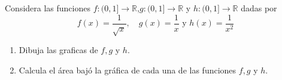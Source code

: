 \documentclass[12pt,a4paper]{article}
\begin{document}
    \begin{mdframed}[style=mdbluebox,frametitle={Ejercicio 4}]
        Considera las funciones $f:(0,1]\to\mathbb{R}$,$g:(0,1]\to\mathbb{R}$ y $h:(0,1]\to\mathbb{R}$ dadas por
        \begin{equation*}
            f(x)=\frac{1}{\sqrt{x}},\quad g(x)=\frac{1}{x}\text{ y }h(x)=\frac{1}{x^{2}}
        \end{equation*}
        \begin{enumerate}
            \item[(a)] Dibuja las graficas de $f,g$ y $h$.
            \item[(b)] Calcula el área bajó la gráfica de cada una de las funciones $f,g$ y $h$.  
        \end{enumerate}
    \end{mdframed}
\end{document}
